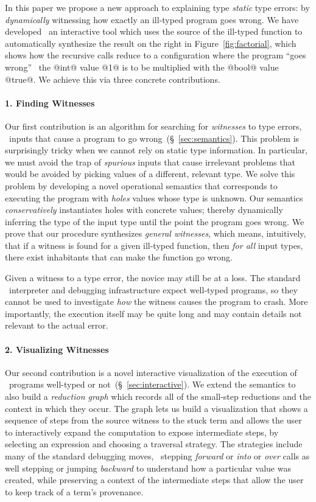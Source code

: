 In this paper we propose a new approach to explaining type
\emph{static} type errors: by \emph{dynamically} witnessing
how exactly an ill-typed program goes wrong.
%
We have developed \toolname\ an interactive tool which uses
the source of the ill-typed function to automatically synthesize
the result on the right in Figure~\ref{fig:factorial}, which
shows how the recursive calls reduce to a configuration where
the program ``goes wrong'' \ie\ the @int@ value @1@ is to be
multiplied with the @bool@ value @true@.
We achieve this via three concrete contributions.

\paragraph{1. Finding Witnesses}
Our first contribution is an algorithm for searching for
\emph{witnesses} to type errors, \ie\ inputs that cause a
program to go wrong~(\S~\ref{sec:semantics}).
%
This problem is surprisingly tricky when we cannot rely on
static type information.
%
In particular, we must avoid the trap of \emph{spurious} inputs
that cause irrelevant problems that would be avoided by picking
values of a different, relevant type.
%
We solve this problem by developing a novel operational semantics
that corresponds to executing the program with \emph{holes}
values whose type is unknown.
%
Our semantics \emph{conservatively} instantiates holes with concrete
values; thereby dynamically inferring the type of the input type
until the point the program goes wrong.
%
We prove that our procedure synthesizes \emph{general witnesses},
which means, intuitively, that if a witness is found for a given
ill-typed function, then \emph{for all} input types, there exist
inhabitants that can make the function go wrong.

Given a witness to a type error, the novice may still be at a loss.
%
The standard \ocaml\ interpreter and debugging infrastructure expect
well-typed programs, so they cannot be used to investigate \emph{how}
the witness causes the program to crash.
%
More importantly, the execution itself may be quite long and may contain
details not relevant to the actual error.

\paragraph{2. Visualizing Witnesses}
Our second contribution is a novel interactive visualization of the
execution of \ocaml\ programs well-typed or not~(\S~\ref{sec:interactive}).
%
We extend the semantics to also build a \emph{reduction graph}
which records all of the small-step reductions and the context
in which they occur.
%
The graph lets us build a visualization that shows a sequence of
steps from the source witness to the stuck term and allows the user
to interactively expand the  computation to expose intermediate steps,
by selecting an expression and choosing a traversal strategy.
%
The strategies include many of the standard debugging moves, \eg\
stepping \emph{forward} or \emph{into} or \emph{over} calls as well
stepping or jumping \emph{backward} to understand how a particular
value was created, while preserving a context of the intermediate
steps that allow the user to keep track of a term's provenance.


